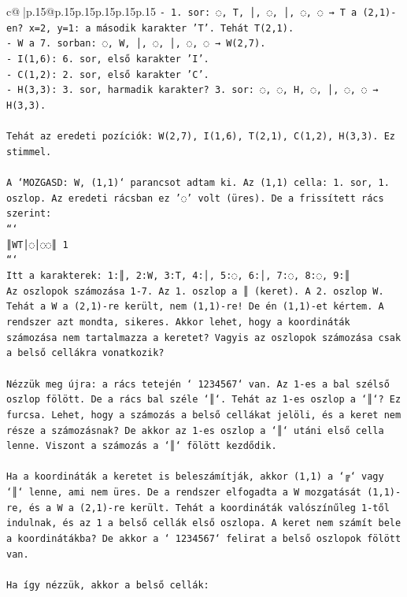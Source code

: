 \documentclass{article}
\begin{document}
{\begin{supertabular}{c@{$\;$}|p{.15\linewidth}@{}p{.15\linewidth}p{.15\linewidth}p{.15\linewidth}p{.15\linewidth}p{.15\linewidth}}
{{{\texttt{{-} 1. sor: ◌, T, │, ◌, │, ◌, ◌ → T a (2,1){-}en? x=2, y=1: a második karakter 'T'. Tehát T(2,1).} \\
\texttt{{-} W a 7. sorban: ◌, W, │, ◌, │, ◌, ◌ → W(2,7).} \\
\texttt{{-} I(1,6): 6. sor, első karakter 'I'.} \\
\texttt{{-} C(1,2): 2. sor, első karakter 'C'.} \\
\texttt{{-} H(3,3): 3. sor, harmadik karakter? 3. sor: ◌, ◌, H, ◌, │, ◌, ◌ → H(3,3).} \\
\\ 
\texttt{Tehát az eredeti pozíciók: W(2,7), I(1,6), T(2,1), C(1,2), H(3,3). Ez stimmel.} \\
\\ 
\texttt{A `MOZGASD: W, (1,1)` parancsot adtam ki. Az (1,1) cella: 1. sor, 1. oszlop. Az eredeti rácsban ez '◌' volt (üres). De a frissített rács szerint:} \\
\texttt{```} \\
\texttt{║WT│◌│◌◌║ 1} \\
\texttt{```} \\
\texttt{Itt a karakterek: 1:║, 2:W, 3:T, 4:│, 5:◌, 6:│, 7:◌, 8:◌, 9:║} \\
\texttt{Az oszlopok számozása 1{-}7. Az 1. oszlop a ║ (keret). A 2. oszlop W. Tehát a W a (2,1){-}re került, nem (1,1){-}re! De én (1,1){-}et kértem. A rendszer azt mondta, sikeres. Akkor lehet, hogy a koordináták számozása nem tartalmazza a keretet? Vagyis az oszlopok számozása csak a belső cellákra vonatkozik?} \\
\\ 
\texttt{Nézzük meg újra: a rács tetején ` 1234567` van. Az 1{-}es a bal szélső oszlop fölött. De a rács bal széle `║`. Tehát az 1{-}es oszlop a `║`? Ez furcsa. Lehet, hogy a számozás a belső cellákat jelöli, és a keret nem része a számozásnak? De akkor az 1{-}es oszlop a `║` utáni első cella lenne. Viszont a számozás a `║` fölött kezdődik.} \\
\\ 
\texttt{Ha a koordináták a keretet is beleszámítják, akkor (1,1) a `╔` vagy `║` lenne, ami nem üres. De a rendszer elfogadta a W mozgatását (1,1){-}re, és a W a (2,1){-}re került. Tehát a koordináták valószínűleg 1{-}től indulnak, és az 1 a belső cellák első oszlopa. A keret nem számít bele a koordinátákba? De akkor a ` 1234567` felirat a belső oszlopok fölött van.} \\
\\ 
\texttt{Ha így nézzük, akkor a belső cellák:} \\
}}}
\end{supertabular}}
\end{document}

